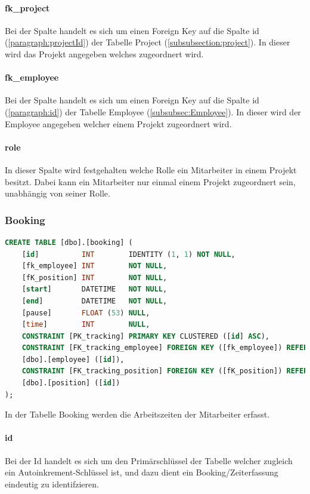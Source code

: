 \documentclass{article}
\begin{document}
\paragraph{fk\_project} Bei der Spalte handelt es sich um einen Foreign Key auf die Spalte id
(\ref{paragraph:projectId}) der Tabelle Project (\ref{subsubsection:project}).
In dieser wird das Projekt angegeben welches zugeordnert wird.

\paragraph{fk\_employee} Bei der Spalte handelt es sich um einen Foreign Key auf die Spalte id
(\ref{paragraph:id}) der Tabelle Employee (\ref{subsubsec:Employee}). In dieser
wird der Employee angegeben welcher einem Projekt zugeordnert wird.

\paragraph{role} In dieser Spalte wird festgehalten welche Rolle ein Mitarbeiter in einem
Projekt besitzt. Dabei kann ein Mitarbeiter nur einmal einem Projekt
zugeordnert sein, unabhängig von seiner Rolle.

\subsubsection{Booking}
\begin{lstlisting}[language=Sql, caption= Create Table Statement für Booking Table]
    CREATE TABLE [dbo].[booking] (
    [id]          INT        IDENTITY (1, 1) NOT NULL,
    [fk_employee] INT        NOT NULL,
    [fK_position] INT        NOT NULL,
    [start]       DATETIME   NOT NULL,
    [end]         DATETIME   NOT NULL,
    [pause]       FLOAT (53) NULL,
    [time]        INT        NULL,
    CONSTRAINT [PK_tracking] PRIMARY KEY CLUSTERED ([id] ASC),
    CONSTRAINT [FK_tracking_employee] FOREIGN KEY ([fk_employee]) REFERENCES
    [dbo].[employee] ([id]),
    CONSTRAINT [FK_tracking_position] FOREIGN KEY ([fK_position]) REFERENCES
    [dbo].[position] ([id])
);


         \end{lstlisting}
In der Tabelle Booking werden die Arbeitszeiten der Mitarbeiter erfasst.

\paragraph{id} Bei der Id handelt es sich um den Primärschlüssel der Tabelle welcher zugleich
ein Autoinkrement-Schlüssel ist, und dazu dient ein Booking/Zeiterfassung
eindeutig zu identifzieren.
\end{document}

